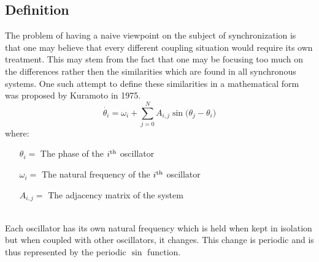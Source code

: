 \label{sec:kuramoto}
\subsection{Definition}
The problem of having a naive viewpoint on the subject of synchronization is that one may believe that every different coupling situation would require its own treatment. This may stem from the fact that one may be focusing too much on the differences rather then the similarities which are found in all synchronous systems. One such attempt to define these similarities in a mathematical form was proposed by Kuramoto in 1975.
\[
\dot{\theta_i} = \omega_i + \sum_{j = 0}^{N}{A_{i, j}\sin({\theta_j - \theta_i}}
)\]
where:
\begin{itemize}
	\item[${\theta_i} = $] The phase of the $i\textsuperscript{th}$ oscillator
	\item[$\omega_i = $] The natural frequency of the $i\textsuperscript{th}$ oscillator
	\item[$A_{i, j} = $] The adjacency matrix of the system
\end{itemize}
~\\
Each oscillator has its own natural frequency which is held when kept in isolation but when coupled with other oscillators, it changes. This change is periodic and is thus represented by the periodic $\sin$ function.


